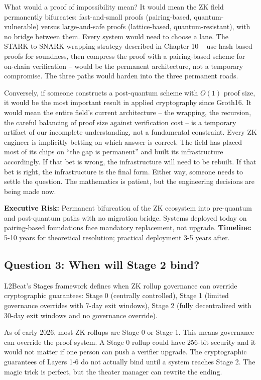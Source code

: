\documentclass[
  11pt,
  openany]{report}
\renewcommand{\textbf}[1]{{\bfseries\color{MidnightBold}#1}}
\begin{document}
What would a proof of impossibility mean? It would mean the ZK field permanently
bifurcates: fast-and-small proofs (pairing-based, quantum-vulnerable) versus
large-and-safe proofs (lattice-based, quantum-resistant), with no bridge between
them. Every system would need to choose a lane. The STARK-to-SNARK wrapping
strategy described in Chapter 10 -- use hash-based proofs for soundness, then
compress the proof with a pairing-based scheme for on-chain verification --
would be the permanent architecture, not a temporary compromise. The three paths
would harden into the three permanent roads.

Conversely, if someone constructs a post-quantum scheme with \(O(1)\) proof
size, it would be the most important result in applied cryptography since
Groth16. It would mean the entire field's current architecture -- the wrapping,
the recursion, the careful balancing of proof size against verification cost --
is a temporary artifact of our incomplete understanding, not a fundamental
constraint. Every ZK engineer is implicitly betting on which answer is correct.
The field has placed most of its chips on ``the gap is permanent'' and built its
infrastructure accordingly. If that bet is wrong, the infrastructure will need
to be rebuilt. If that bet is right, the infrastructure is the final form.
Either way, someone needs to settle the question. The mathematics is patient,
but the engineering decisions are being made now.

\textbf{Executive Risk:} Permanent bifurcation of the ZK ecosystem into
pre-quantum and post-quantum paths with no migration bridge. Systems deployed
today on pairing-based foundations face mandatory replacement, not upgrade.
\textbf{Timeline:} 5-10 years for theoretical resolution; practical deployment
3-5 years after.

\subsection{Question 3: When will Stage 2
bind?}\label{question-3-when-will-stage-2-bind}

L2Beat's Stages framework defines when ZK rollup governance can override
cryptographic guarantees: Stage 0 (centrally controlled), Stage 1 (limited
governance overrides with 7-day exit windows), Stage 2 (fully decentralized with
30-day exit windows and no governance override).

As of early 2026, most ZK rollups are Stage 0 or Stage 1. This means governance
can override the proof system. A Stage 0 rollup could have 256-bit security and
it would not matter if one person can push a verifier upgrade. The cryptographic
guarantees of Layers 1-6 do not actually bind until a system reaches Stage 2.
The magic trick is perfect, but the theater manager can rewrite the ending.
\end{document}
